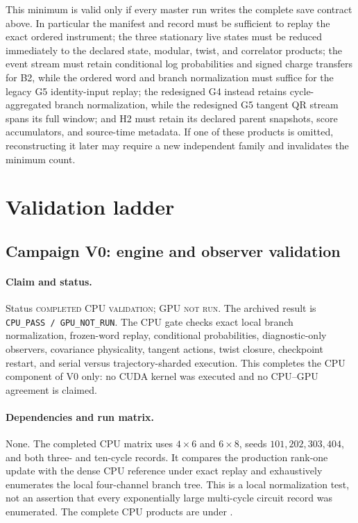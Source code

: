 \documentclass[aps,prx,twocolumn,floatfix,nofootinbib,superscriptaddress,longbibliography]{revtex4-2}
\newcommand{\code}[1]{\texttt{#1}}
\begin{document}
This minimum is valid only if every master run writes the complete save contract above.
In particular the manifest and record must be sufficient to replay the exact ordered
instrument; the three stationary live states must be reduced immediately to the declared
state, modular, twist, and correlator products; the event stream must retain conditional log probabilities and signed
charge transfers for B2, while the ordered word and branch normalization must suffice for
the legacy G5 identity-input replay; the redesigned G4 instead retains cycle-aggregated
branch normalization, while the redesigned G5 tangent QR stream spans its full window; and H2
must retain its declared parent snapshots, score accumulators, and source-time metadata.
If one of these products is omitted, reconstructing it later may require a new independent
family and invalidates the minimum count.

\section{Validation ladder}

\subsection{Campaign V0: engine and observer validation}
\label{camp:V0}
\paragraph*{Claim and status.}
Status \textsc{completed CPU validation; GPU not run}.  The archived result is
\code{CPU\_PASS / GPU\_NOT\_RUN}.  The CPU gate checks exact local branch normalization,
frozen-word replay, conditional probabilities, diagnostic-only observers, covariance
physicality, tangent actions, twist closure, checkpoint restart, and serial versus
trajectory-sharded execution.  This completes the CPU component of V0 only: no CUDA
kernel was executed and no CPU--GPU agreement is claimed.

\paragraph*{Dependencies and run matrix.}
None.  The completed CPU matrix uses $4\times6$ and $6\times8$, seeds
$101,202,303,404$, and both three- and ten-cycle records.  It compares the production
rank-one update with the dense CPU reference under exact replay and exhaustively enumerates
the local four-channel branch tree.  This is a local normalization test, not an assertion
that every exponentially large multi-cycle circuit record was enumerated.  The complete
CPU products are under
.
\end{document}
